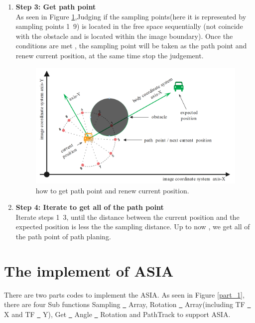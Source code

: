 \begin{enumerate}
    
    \item \textbf{Step 3: Get path point}\\
   As seen in Figure \ref{UpdatePathPoint},Judging if the sampling points(here it is represented by sampling points 1~9) is located in the free space sequentially (not coincide with the obstacle and is located within the image boundary). Once the conditions are met , the sampling point will be taken as the path point and renew current position, at the same time stop the judgement.
   
        \begin{figure}[thb]
        \centering
        \includegraphics[width=1\textwidth]{images/PathPlaningUpdatePathPoint.png}
        \caption[how to get path point and renew current position]{how to get path point and renew current position.}\label{UpdatePathPoint}
    \end{figure}
    
    \item \textbf{Step 4: Iterate to get all of the path point}\\
    Iterate steps 1~3, until the distance between the current position and the expected position is less the the sampling distance. Up to now , we get all of the path point of path planing.
\end{enumerate}

\section{The implement of ASIA}

There are two parts codes to implement the ASIA. As seen in Figure \ref{part_1}, there are four Sub functions Sampling \underline{~} Array, Rotation \underline{~} Array(including TF \underline{~} X and TF \underline{~} Y), Get \underline{~} Angle \underline{~} Rotation and PathTrack to support ASIA.

